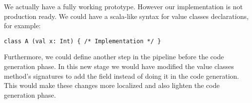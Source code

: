 We actually have a fully working prototype. However our implementation is not production ready. 
We could have a scala-like syntax for value classes declarations, for example:
\begin{lstlisting}
class A (val x: Int) { /* Implementation */ }
\end{lstlisting}
Furthermore, we could define another step in the pipeline before the code generation phase. 
In this new stage we would have modified the value classes method's signatures to add the field instead of doing it in the code generation. 
This would make these changes more localized and also lighten the code generation phase.
